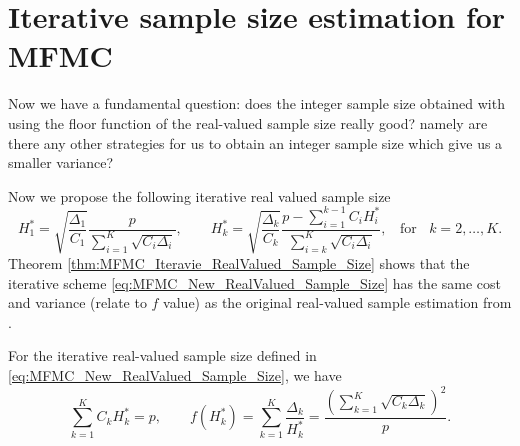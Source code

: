 \section{Iterative sample size estimation for MFMC}\label{sec:Iterative_IntegerValued_Sample_Size}

Now we have a fundamental question: does the integer sample size obtained with using the floor function of the real-valued sample size really good? namely are there any other strategies for us to obtain an integer sample size which give us a smaller variance?

Now we propose the following iterative real valued sample size
%
\begin{equation}
    \label{eq:MFMC_New_RealValued_Sample_Size}
    H_1^* = \sqrt{\frac{\Delta_1}{C_1}}\frac{p}{\sum_{i=1}^K\sqrt{C_i\Delta_i}}, \qquad H_k^* = \sqrt{\frac{\Delta_k}{C_k}}\frac{p-\sum_{i=1}^{k-1}C_iH_i^*}{\sum_{i=k}^K\sqrt{C_i\Delta_i}}, \;\;\text{ for }\;\; k = 2,\ldots, K.
\end{equation}
%
Theorem \ref{thm:MFMC_Iteravie_RealValued_Sample_Size} shows that the iterative scheme \eqref{eq:MFMC_New_RealValued_Sample_Size} has the same cost and variance (relate to $f$ value) as the original real-valued sample estimation from \cite{PeGuWi:2018}. 

\begin{theorem}\label{thm:MFMC_Iteravie_RealValued_Sample_Size}
For the iterative real-valued sample size defined in \eqref{eq:MFMC_New_RealValued_Sample_Size}, we have
\[
\sum_{k=1}^K C_kH_k^*=p,\qquad  f(H_k^*) = \sum_{k=1}^K\frac{\Delta_k}{H_k^*} = \frac{\left(\sum_{k=1}^K\sqrt{C_k\Delta_k}\right)^2}{p}.
\]
\end{theorem}

